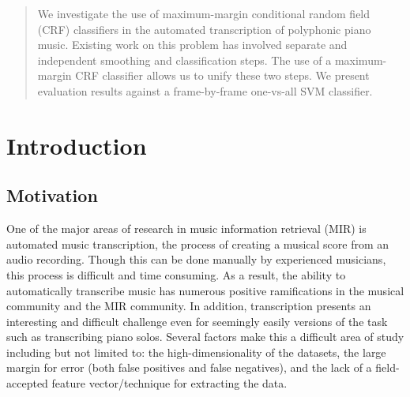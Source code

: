 \documentclass{article}
\begin{document}
 


\begin{abstract} 
We investigate the use of maximum-margin conditional random field (CRF)
classifiers in the automated transcription of polyphonic piano music.
Existing work on this problem has involved separate and independent smoothing
and classification steps. The use of a maximum-margin CRF classifier allows
us to unify these two steps. We present evaluation results against a
frame-by-frame one-vs-all SVM classifier.
\end{abstract} 


\section{Introduction}

\subsection{Motivation}
One of the major areas of research in music information retrieval (MIR) is
automated music transcription, the
process of creating a musical score from an audio recording. Though this
can be done manually by experienced musicians, this process is difficult
and time consuming. As a result, the ability to automatically transcribe
music has numerous positive ramifications in the musical community and the
MIR community. In addition, transcription presents an interesting and
difficult challenge even for seemingly easily versions of the task such as
transcribing piano solos. Several factors make this a difficult area of
study including but not limited to: the high-dimensionality of the
datasets, the large margin for error (both false positives and false
negatives), and the lack of a field-accepted feature vector/technique for
extracting the data. 
\end{document}
